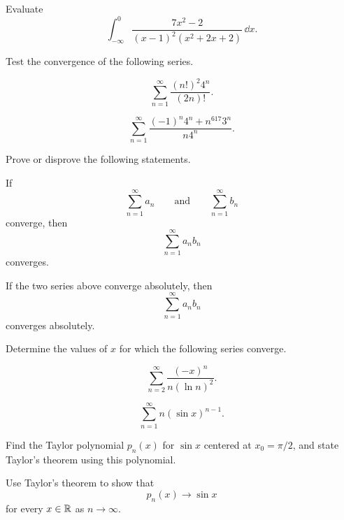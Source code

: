 \begin{problem}
Evaluate
\[
\int_{-\infty}^{0}
\frac{7x^2-2}{(x-1)^2(x^2+2x+2)}\,\dd x.
\]
\end{problem}

\begin{problem}
Test the convergence of the following series.
\begin{problemsubparts}
\item
\[
\sum_{n=1}^{\infty}\frac{(n!)^2 4^n}{(2n)!}.
\]
\item
\[
\sum_{n=1}^{\infty}
\frac{(-1)^n4^n+n^{617}3^n}{n4^n}.
\]
\end{problemsubparts}
\end{problem}

\begin{problem}
Prove or disprove the following statements.
\begin{problemsubparts}
\item If
\[
\sum_{n=1}^{\infty}a_n
\qquad\text{and}\qquad
\sum_{n=1}^{\infty}b_n
\]
converge, then
\[
\sum_{n=1}^{\infty}a_nb_n
\]
converges.
\item If the two series above converge absolutely, then
\[
\sum_{n=1}^{\infty}a_nb_n
\]
converges absolutely.
\end{problemsubparts}
\end{problem}

\begin{problem}
Determine the values of $x$ for which the following series converge.
\begin{problemsubparts}
\item
\[
\sum_{n=2}^{\infty}\frac{(-x)^n}{n(\ln n)^2}.
\]
\item
\[
\sum_{n=1}^{\infty}n(\sin x)^{n-1}.
\]
\end{problemsubparts}
\end{problem}

\begin{problem}
\begin{problemsubparts}
\item Find the Taylor polynomial $p_n(x)$ for $\sin x$ centered at $x_0=\pi/2$, and state Taylor's theorem using this polynomial.
\item Use Taylor's theorem to show that
\[
p_n(x)\to\sin x
\]
for every $x\in\mathbb{R}$ as $n\to\infty$.
\end{problemsubparts}
\end{problem}

